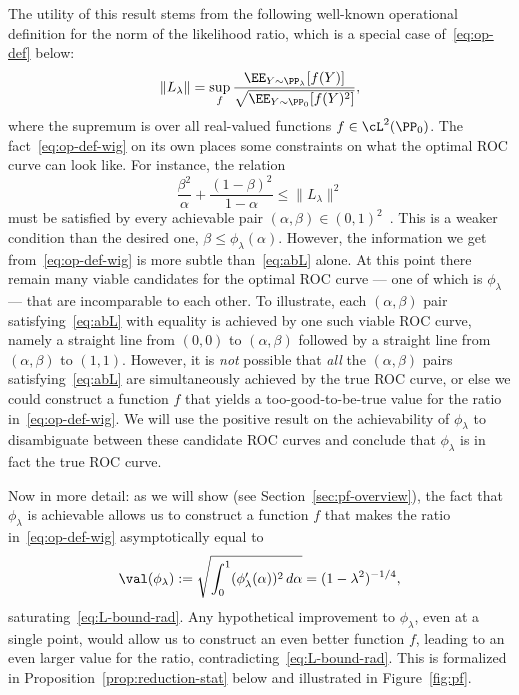 \documentclass[11pt]{article}
\begin{document}
\noindent The utility of this result stems from the following well-known operational definition for the norm of the likelihood ratio, which is a special case of~\eqref{eq:op-def} below:
\begin{equation}\label{eq:op-def-wig}
\|L_\lambda\| = \sup_f \frac{\EE_{Y \sim \PP_\lambda}[f(Y)]}{\sqrt{\EE_{Y \sim \PP_0}[f(Y)^2]}},
\end{equation}
where the supremum is over all real-valued functions $f \in \cL^2(\PP_0)$. The fact~\eqref{eq:op-def-wig} on its own places some constraints on what the optimal ROC curve can look like. For instance, the relation
\begin{equation}\label{eq:abL}
\frac{\beta^2}{\alpha} + \frac{(1-\beta)^2}{1-\alpha} \le \|L_\lambda\|^2
\end{equation}
must be satisfied by every achievable pair $(\alpha,\beta) \in (0,1)^2$~\cite[Proposition~2.5]{opt-subopt}. This is a weaker condition than the desired one, $\beta \le \phi_\lambda(\alpha)$. However, the information we get from~\eqref{eq:op-def-wig} is more subtle than~\eqref{eq:abL} alone. At this point there remain many viable candidates for the optimal ROC curve --- one of which is $\phi_\lambda$ --- that are incomparable to each other. To illustrate, each $(\alpha,\beta)$ pair satisfying~\eqref{eq:abL} with equality is achieved by one such viable ROC curve, namely a straight line from $(0,0)$ to $(\alpha,\beta)$ followed by a straight line from $(\alpha,\beta)$ to $(1,1)$. However, it is \emph{not} possible that \emph{all} the $(\alpha,\beta)$ pairs satisfying~\eqref{eq:abL} are simultaneously achieved by the true ROC curve, or else we could construct a function $f$ that yields a too-good-to-be-true value for the ratio in~\eqref{eq:op-def-wig}. We will use the positive result on the achievability of $\phi_\lambda$ to disambiguate between these candidate ROC curves and conclude that $\phi_\lambda$ is in fact the true ROC curve.

Now in more detail: as we will show (see Section~\ref{sec:pf-overview}), the fact that $\phi_\lambda$ is achievable allows us to construct a function $f$ that makes the ratio in~\eqref{eq:op-def-wig} asymptotically equal to
\[ \val(\phi_\lambda) := \sqrt{\int_0^1 (\phi_\lambda'(\alpha))^2 \,d\alpha} = (1-\lambda^2)^{-1/4}, \]
saturating~\eqref{eq:L-bound-rad}. Any hypothetical improvement to $\phi_\lambda$, even at a single point, would allow us to construct an even better function $f$, leading to an even larger value for the ratio, contradicting~\eqref{eq:L-bound-rad}. This is formalized in Proposition~\ref{prop:reduction-stat} below and illustrated in Figure~\ref{fig:pf}.
\end{document}
